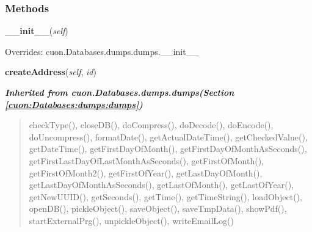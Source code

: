   \subsubsection{Methods}

    \vspace{0.5ex}

\hspace{.8\funcindent}\begin{boxedminipage}{\funcwidth}

    \raggedright \textbf{\_\_init\_\_}(\textit{self})

\setlength{\parskip}{2ex}
\setlength{\parskip}{1ex}
      Overrides: cuon.Databases.dumps.dumps.\_\_init\_\_

    \end{boxedminipage}

    \label{cuon:OpenOffice:letter:letter:createAddress}

    \vspace{0.5ex}

\hspace{.8\funcindent}\begin{boxedminipage}{\funcwidth}

    \raggedright \textbf{createAddress}(\textit{self}, \textit{id})

\setlength{\parskip}{2ex}
\setlength{\parskip}{1ex}
    \end{boxedminipage}


\large{\textbf{\textit{Inherited from cuon.Databases.dumps.dumps\textit{(Section \ref{cuon:Databases:dumps:dumps})}}}}

\begin{quote}
checkType(), closeDB(), doCompress(), doDecode(), doEncode(), doUncompress(), formatDate(), getActualDateTime(), getCheckedValue(), getDateTime(), getFirstDayOfMonth(), getFirstDayOfMonthAsSeconds(), getFirstLastDayOfLastMonthAsSeconds(), getFirstOfMonth(), getFirstOfMonth2(), getFirstOfYear(), getLastDayOfMonth(), getLastDayOfMonthAsSeconds(), getLastOfMonth(), getLastOfYear(), getNewUUID(), getSeconds(), getTime(), getTimeString(), loadObject(), openDB(), pickleObject(), saveObject(), saveTmpData(), showPdf(), startExternalPrg(), unpickleObject(), writeEmailLog()
\end{quote}
